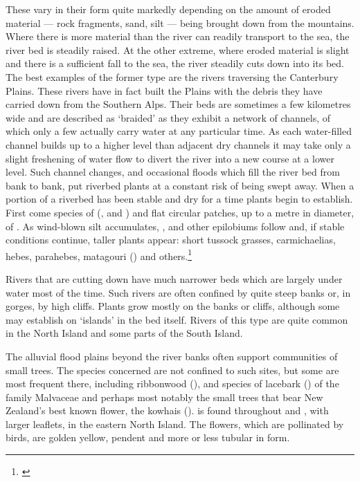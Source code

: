 These vary in their form quite markedly depending on the amount of eroded material --- rock fragments, sand, silt --- being brought down from the mountains.
Where there is more material than the river can readily transport to the sea, the river bed is steadily raised.
At the other extreme, where eroded material is slight and there is a sufficient fall to the sea, the river steadily cuts down into its bed.
The best examples of the former type are the rivers traversing the Canterbury Plains.
These rivers have in fact built the Plains with the debris they have carried down from the Southern Alps.
Their beds are sometimes a few kilometres wide and are described as `braided' as they exhibit a network of channels, of which only a few actually carry water at any particular time.
As each water-filled channel builds up to a higher level than adjacent dry channels it may take only a slight freshening of water flow to divert the river into a new course at a lower level.
Such channel changes, and occasional floods which fill the river bed from bank to bank, put riverbed plants at a constant risk of being swept away.
When a portion of a riverbed has been stable and dry for a time plants begin to establish.
First come species of  (,  and ) and flat circular patches, up to a metre in diameter, of .
As wind-blown silt accumulates, ,  and other epilobiums follow and, if stable conditions continue, taller plants appear: short tussock grasses, carmichaelias, hebes, parahebes, matagouri () and others.\footnote{\cite{calder1961plant}}

Rivers that are cutting down have much narrower beds which are largely under water most of the time.
Such rivers are often confined by quite steep banks or, in gorges, by high cliffs.
Plants grow mostly on the banks or cliffs, although some may establish on `islands' in the bed itself.
Rivers of this type are quite common in the North Island and some parts of the South Island.

The alluvial flood plains beyond the river banks often support communities of small trees.
The species concerned are not confined to such sites, but some are most frequent there, including ribbonwood (), and species of lacebark () of the family Malvaceae and perhaps most notably the small trees that bear New Zealand's best known flower, the kowhais ().   is found throughout and , with larger leaflets, in the eastern North Island.
The flowers, which are pollinated by birds, are golden yellow, pendent and more or less tubular in form.

